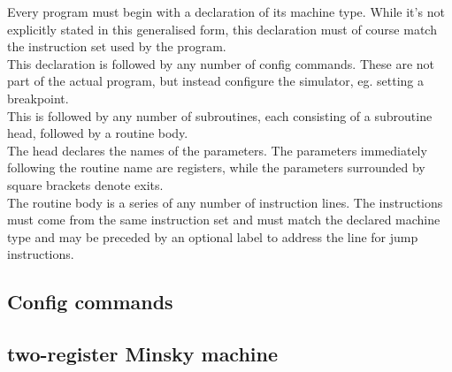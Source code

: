 Every program must begin with a declaration of its machine type. While it's not explicitly stated in this generalised form, this declaration must of course match the instruction set used by the program.\\
This declaration is followed by any number of config commands. These are not part of the actual program, but instead configure the simulator, eg. setting a breakpoint.\\
This is followed by any number of subroutines, each consisting of a subroutine head, followed by a routine body.\\
The head declares the names of the parameters. The parameters immediately following the routine name are registers, while the parameters surrounded by square brackets denote exits.\\
The routine body is a series of any number of instruction lines. The instructions must come from the same instruction set and must match the declared machine type and may be preceded by an optional label to address the line for jump instructions.\\

\subsection{Config commands}

\subsection{two-register Minsky machine}

